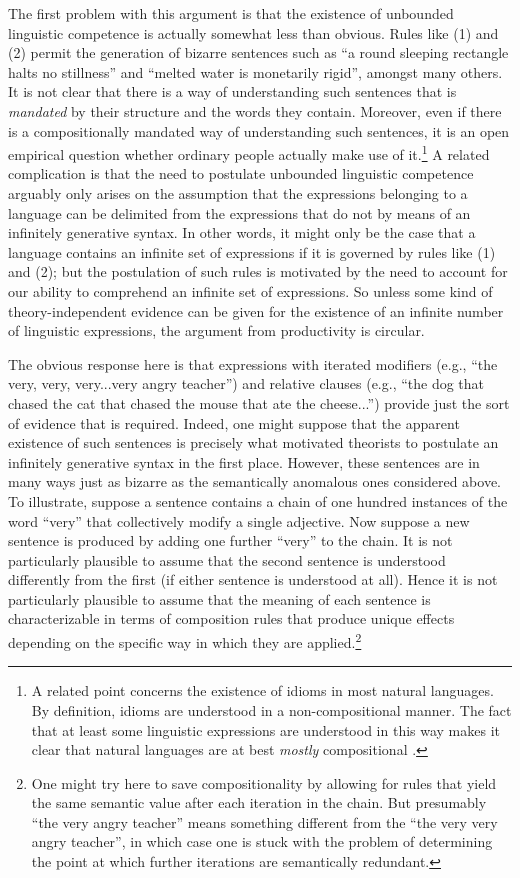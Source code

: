 The first problem with this argument is that the existence of unbounded linguistic competence is actually somewhat less than obvious. Rules like (1) and (2) permit the generation of bizarre sentences such as ``a round sleeping rectangle halts no stillness'' and ``melted water is monetarily rigid'', amongst many others. It is not clear that there is a way of understanding such sentences that is \textit{mandated} by their structure and the words they contain. Moreover, even if there is a compositionally mandated way of understanding such sentences, it is an open empirical question whether ordinary people actually make use of it.\footnote{A related point concerns the existence of idioms in most natural languages. By definition, idioms are understood in a non-compositional manner. The fact that at least some linguistic expressions are understood in this way makes it clear that natural languages are at best \textit{mostly} compositional \citep{FodorPylyshyn:1988,Szabo:2012}.} A related complication is that the need to postulate unbounded linguistic competence arguably only arises on the assumption that the expressions belonging to a language can be delimited from the expressions that do not by means of an infinitely generative syntax. In other words, it might only be the case that a language contains an infinite set of expressions if it is governed by rules like (1) and (2); but the postulation of such rules is motivated by the need to account for our ability to comprehend an infinite set of expressions. So unless some kind of theory-independent evidence can be given for the existence of an infinite number of linguistic expressions, the argument from productivity is circular.

The obvious response here is that expressions with iterated modifiers (e.g., ``the very, very, very...very angry teacher'') and relative clauses (e.g., ``the dog that chased the cat that chased the mouse that ate the cheese...'') provide just the sort of evidence that is required. Indeed, one might suppose that the apparent existence of such sentences is precisely what motivated theorists to postulate an infinitely generative syntax in the first place. However, these sentences are in many ways just as bizarre as the semantically anomalous ones considered above. To illustrate, suppose a sentence contains a chain of one hundred instances of the word ``very'' that collectively modify a single adjective. Now suppose a new sentence is produced by adding one further ``very'' to the chain. It is not particularly plausible to assume that the second sentence is understood differently from the first (if either sentence is understood at all). Hence it is not particularly plausible to assume that the meaning of each sentence is characterizable in terms of composition rules that produce unique effects depending on the specific way in which they are applied.\footnote{One might try here to save compositionality by allowing for rules that yield the same semantic value after each iteration in the chain. But presumably ``the very angry teacher'' means something different from the ``the very very angry teacher'', in which case one is stuck with the problem of determining the point at which further iterations are semantically redundant.} 

